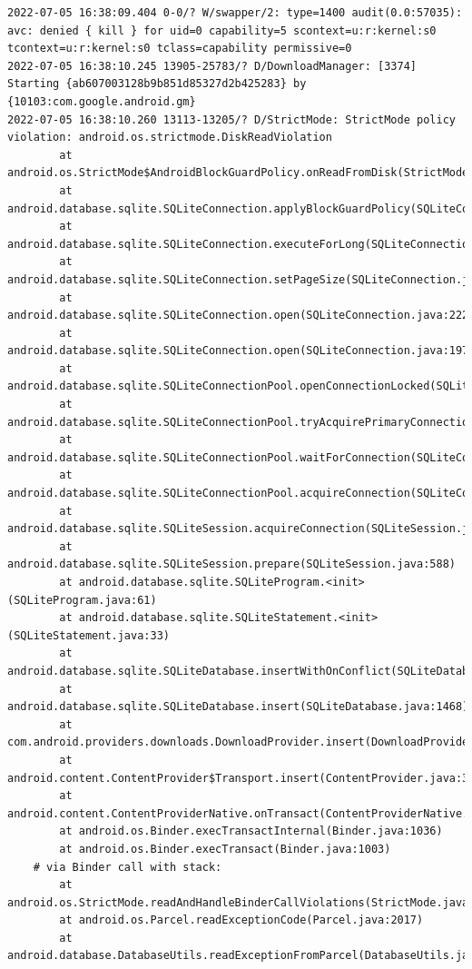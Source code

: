\documentclass[a4paper,12pt]{book}
\begin{document}
\begin{lstlisting}
2022-07-05 16:38:09.404 0-0/? W/swapper/2: type=1400 audit(0.0:57035): avc: denied { kill } for uid=0 capability=5 scontext=u:r:kernel:s0 tcontext=u:r:kernel:s0 tclass=capability permissive=0
2022-07-05 16:38:10.245 13905-25783/? D/DownloadManager: [3374] Starting {ab607003128b9b851d85327d2b425283} by {10103:com.google.android.gm}
2022-07-05 16:38:10.260 13113-13205/? D/StrictMode: StrictMode policy violation: android.os.strictmode.DiskReadViolation
        at android.os.StrictMode$AndroidBlockGuardPolicy.onReadFromDisk(StrictMode.java:1571)
        at android.database.sqlite.SQLiteConnection.applyBlockGuardPolicy(SQLiteConnection.java:1138)
        at android.database.sqlite.SQLiteConnection.executeForLong(SQLiteConnection.java:688)
        at android.database.sqlite.SQLiteConnection.setPageSize(SQLiteConnection.java:260)
        at android.database.sqlite.SQLiteConnection.open(SQLiteConnection.java:222)
        at android.database.sqlite.SQLiteConnection.open(SQLiteConnection.java:197)
        at android.database.sqlite.SQLiteConnectionPool.openConnectionLocked(SQLiteConnectionPool.java:505)
        at android.database.sqlite.SQLiteConnectionPool.tryAcquirePrimaryConnectionLocked(SQLiteConnectionPool.java:949)
        at android.database.sqlite.SQLiteConnectionPool.waitForConnection(SQLiteConnectionPool.java:699)
        at android.database.sqlite.SQLiteConnectionPool.acquireConnection(SQLiteConnectionPool.java:380)
        at android.database.sqlite.SQLiteSession.acquireConnection(SQLiteSession.java:896)
        at android.database.sqlite.SQLiteSession.prepare(SQLiteSession.java:588)
        at android.database.sqlite.SQLiteProgram.<init>(SQLiteProgram.java:61)
        at android.database.sqlite.SQLiteStatement.<init>(SQLiteStatement.java:33)
        at android.database.sqlite.SQLiteDatabase.insertWithOnConflict(SQLiteDatabase.java:1597)
        at android.database.sqlite.SQLiteDatabase.insert(SQLiteDatabase.java:1468)
        at com.android.providers.downloads.DownloadProvider.insert(DownloadProvider.java:972)
        at android.content.ContentProvider$Transport.insert(ContentProvider.java:309)
        at android.content.ContentProviderNative.onTransact(ContentProviderNative.java:154)
        at android.os.Binder.execTransactInternal(Binder.java:1036)
        at android.os.Binder.execTransact(Binder.java:1003)
    # via Binder call with stack:
        at android.os.StrictMode.readAndHandleBinderCallViolations(StrictMode.java:2289)
        at android.os.Parcel.readExceptionCode(Parcel.java:2017)
        at android.database.DatabaseUtils.readExceptionFromParcel(DatabaseUtils.java:137)

\end{lstlisting}
\end{document}
